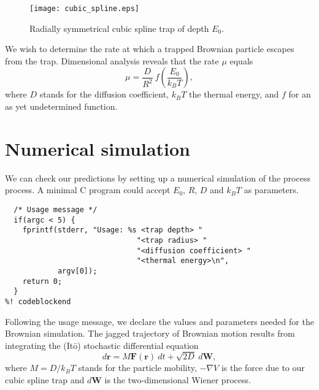 \documentclass{article}
\begin{document}
\begin{figure}
  \centering
  \texttt{[image: cubic\_spline.eps]}
  \caption{\label{cubic_spline}Radially symmetrical cubic spline trap of depth
           $E_0$.}
\end{figure}

We wish to determine the rate at which a trapped Brownian particle escapes from
the trap. Dimensional analysis reveals that the rate $\mu$ equals
\begin{equation}
\label{dimensional_analysis}
  \mu = \frac{D}{R^2}\ f\left(\frac{E_0}{k_BT}\right),
\end{equation}
where $D$ stands for the diffusion coefficient, $k_BT$ the thermal energy, and
$f$ for an as yet undetermined function.

\section{Numerical simulation}

We can check our predictions by setting up a numerical simulation of the process
process. A minimal C program could accept $E_0$, $R$, $D$ and $k_BT$ as
parameters.

\begin{lstlisting}[frame=single]
%! codeblock: usage_message
  /* Usage message */
  if(argc < 5) {
    fprintf(stderr, "Usage: %s <trap depth> "
                              "<trap radius> "
                              "<diffusion coefficient> "
                              "<thermal energy>\n",
            argv[0]);
    return 0;
  }
%! codeblockend
\end{lstlisting}


\begin{comment}
# include <stdio.h>
# include <stdlib.h>
# include <math.h>
# include "random.h"

int main(int argc, char * argv[])
{




  return 0;
}
\end{comment}

Following the usage message, we declare the values and parameters needed for the
Brownian simulation. The jagged trajectory of Brownian motion results from
integrating the (It\=o) stochastic differential equation
\begin{equation}
  d\mathbf{r} = M \mathbf{F}(\mathbf{r})\ dt + \sqrt{2 D}\ d\mathbf{W},
\end{equation}
where $M = D/k_BT$ stands for the particle mobility, $-\nabla V$ is the force
due to our cubic spline trap and $d\mathbf{W}$ is the two-dimensional Wiener
process.
\end{document}
